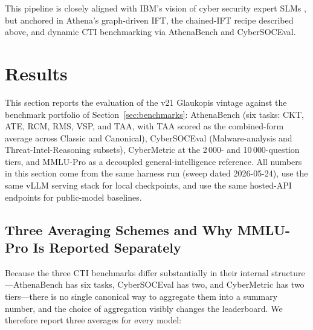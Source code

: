 \documentclass[conference]{IEEEtran}
\begin{document}
This pipeline is closely aligned with IBM's vision of cyber security expert SLMs \cite{levi2024cyberpal,levi2025toward}, but anchored in Athena's graph-driven IFT, the chained-IFT recipe described above, and dynamic CTI benchmarking via AthenaBench and CyberSOCEval.


\section{Results}
\label{sec:results}

This section reports the evaluation of the v21 Glaukopis vintage against the benchmark portfolio of Section~\ref{sec:benchmarks}: AthenaBench (six tasks: CKT, ATE, RCM, RMS, VSP, and TAA, with TAA scored as the combined-form average across Classic and Canonical), CyberSOCEval (Malware-analysis and Threat-Intel-Reasoning subsets), CyberMetric at the 2\,000- and 10\,000-question tiers, and MMLU-Pro as a decoupled general-intelligence reference. All numbers in this section come from the same harness run (sweep dated 2026-05-24), use the same vLLM serving stack for local checkpoints, and use the same hosted-API endpoints for public-model baselines.

\subsection{Three Averaging Schemes and Why MMLU-Pro Is Reported Separately}
\label{sec:results-averaging}

Because the three CTI benchmarks differ substantially in their internal structure---AthenaBench has six tasks, CyberSOCEval has two, and CyberMetric has two tiers---there is no single canonical way to aggregate them into a summary number, and the choice of aggregation visibly changes the leaderboard. We therefore report three averages for every model:
\end{document}

